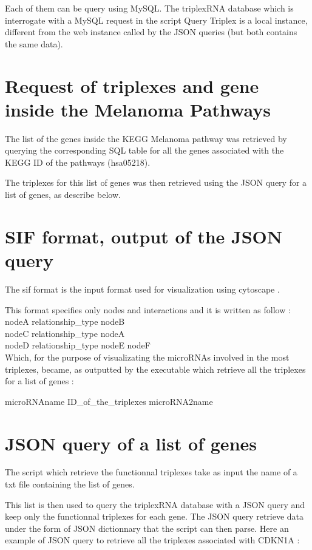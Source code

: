\documentclass[a4paper,12pt]{report}
\begin{document}
Each of them can be query using MySQL.
The triplexRNA database which is interrogate with a MySQL request in the script Query Triplex is a local instance, different from the web instance called by the JSON queries (but both contains the same data).

\section{Request of triplexes and gene inside the Melanoma Pathways}

The list of the genes inside the KEGG Melanoma pathway\cite{KEGG} was retrieved by querying the corresponding SQL table for all the genes associated with the KEGG ID of the pathways (hsa05218).

The triplexes for this list of genes was then retrieved using the JSON query for a list of genes, as describe below.

\section{SIF format, output of the JSON query}

The sif format is the input format used for visualization using cytoscape \cite{cytoscape}. 

This format specifies only nodes and interactions and it is written as follow :
\\

nodeA relationship\_type nodeB \\
nodeC relationship\_type nodeA \\
nodeD relationship\_type nodeE nodeF \\
Which, for the purpose of visualizating the microRNAs involved in the most triplexes, became, as outputted by the executable which retrieve all the triplexes for a list of genes :

microRNAname ID\_of\_the\_triplexes microRNA2name

\section{JSON query of a list of genes}

The script which retrieve the functionnal triplexes take as input the name of a txt file containing the list of genes.

This list is then used to query the triplexRNA database with a JSON query and keep only the functionnal triplexes for each gene. The JSON query retrieve data under the form of JSON dictionnary that the script can then parse. Here an example of JSON query to retrieve all the triplexes associated with CDKN1A :
\end{document}
